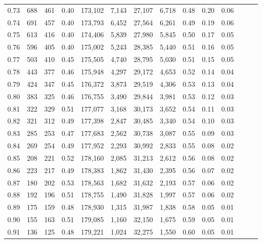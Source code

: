 \begin{tabular}{rrrrrrrrrrrrrr}
0.73 &    688 &  461 &  0.40 &  173,102 &    7,143 &  27,107 &   6,718 &  0.48 &  0.20 &      0.06 \\
0.74 &    691 &  457 &  0.40 &  173,793 &    6,452 &  27,564 &   6,261 &  0.49 &  0.19 &      0.06 \\
0.75 &    613 &  416 &  0.40 &  174,406 &    5,839 &  27,980 &   5,845 &  0.50 &  0.17 &      0.05 \\
0.76 &    596 &  405 &  0.40 &  175,002 &    5,243 &  28,385 &   5,440 &  0.51 &  0.16 &      0.05 \\
0.77 &    503 &  410 &  0.45 &  175,505 &    4,740 &  28,795 &   5,030 &  0.51 &  0.15 &      0.05 \\
0.78 &    443 &  377 &  0.46 &  175,948 &    4,297 &  29,172 &   4,653 &  0.52 &  0.14 &      0.04 \\
0.79 &    424 &  347 &  0.45 &  176,372 &    3,873 &  29,519 &   4,306 &  0.53 &  0.13 &      0.04 \\
0.80 &    383 &  325 &  0.46 &  176,755 &    3,490 &  29,844 &   3,981 &  0.53 &  0.12 &      0.03 \\
0.81 &    322 &  329 &  0.51 &  177,077 &    3,168 &  30,173 &   3,652 &  0.54 &  0.11 &      0.03 \\
0.82 &    321 &  312 &  0.49 &  177,398 &    2,847 &  30,485 &   3,340 &  0.54 &  0.10 &      0.03 \\
0.83 &    285 &  253 &  0.47 &  177,683 &    2,562 &  30,738 &   3,087 &  0.55 &  0.09 &      0.03 \\
0.84 &    269 &  254 &  0.49 &  177,952 &    2,293 &  30,992 &   2,833 &  0.55 &  0.08 &      0.02 \\
0.85 &    208 &  221 &  0.52 &  178,160 &    2,085 &  31,213 &   2,612 &  0.56 &  0.08 &      0.02 \\
0.86 &    223 &  217 &  0.49 &  178,383 &    1,862 &  31,430 &   2,395 &  0.56 &  0.07 &      0.02 \\
0.87 &    180 &  202 &  0.53 &  178,563 &    1,682 &  31,632 &   2,193 &  0.57 &  0.06 &      0.02 \\
0.88 &    192 &  196 &  0.51 &  178,755 &    1,490 &  31,828 &   1,997 &  0.57 &  0.06 &      0.02 \\
0.89 &    175 &  159 &  0.48 &  178,930 &    1,315 &  31,987 &   1,838 &  0.58 &  0.05 &      0.01 \\
0.90 &    155 &  163 &  0.51 &  179,085 &    1,160 &  32,150 &   1,675 &  0.59 &  0.05 &      0.01 \\
0.91 &    136 &  125 &  0.48 &  179,221 &    1,024 &  32,275 &   1,550 &  0.60 &  0.05 &      0.01 \\

\end{tabular}
